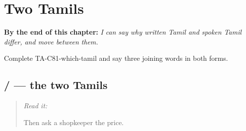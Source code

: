 
\chapter{Two Tamils}
\label{ch:ta-two-tamils}

\begin{chapteropening}
\textbf{By the end of this chapter:} \emph{I can say why written Tamil and spoken Tamil differ, and move between them.}

Complete TA-C81-which-tamil and say three joining words in both forms.
\end{chapteropening}

\section[\texorpdfstring{\ta{ஆனால்} / \ta{ஆனா} (āṉāl / āṉā)}{ஆனால் / ஆனா (āṉāl / āṉā)}]{ /  — the two Tamils}

\label{lesson:TA-C81-two-tamils}



\begin{quote}
\emph{Read it:} \textbf{}

Then ask a shopkeeper the price.
\end{quote}


